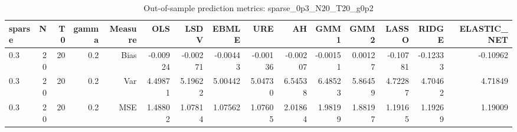 \begin{table}[!htbp]\centering
\caption{Out-of-sample prediction metrics: sparse_0p3_N20_T20_g0p2}
\label{tab:table3_sparse_0p3_N20_T20_g0p2}
\begin{tabular}{lrrrrrrrrrrrrrr}
\hline
sparse & N & T0 & gamma & Measure & OLS & LSDV & EBMLE & URE & AH & GMM1 & GMM2 & LASSO & RIDGE & ELASTIC_NET \\
\hline
0.3 & 20 & 20 & 0.2 & Bias & -0.00924 & -0.00271 & -0.00443 & -0.00136 & -0.00207 & -0.00151 & 0.00127 & -0.10781 & -0.12333 & -0.10962 \\
0.3 & 20 & 20 & 0.2 & Var & 4.49871 & 5.19622 & 5.00442 & 5.04730 & 6.54538 & 6.48523 & 5.86459 & 4.72287 & 4.70462 & 4.71849 \\
0.3 & 20 & 20 & 0.2 & MSE & 1.48802 & 1.07814 & 1.07562 & 1.07605 & 2.01864 & 1.98199 & 1.88197 & 1.19165 & 1.19269 & 1.19009 \\
\hline
\end{tabular}
\end{table}

